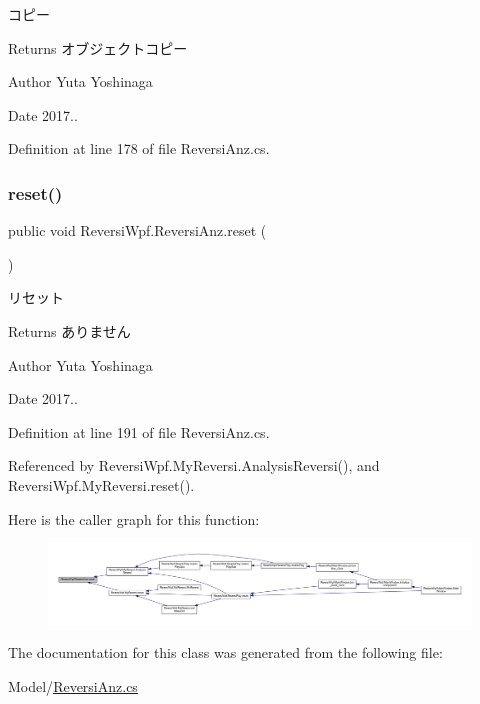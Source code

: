 コピー 

\begin{DoxyReturn}{Returns}
オブジェクトコピー 
\end{DoxyReturn}
\begin{DoxyAuthor}{Author}
Yuta Yoshinaga 
\end{DoxyAuthor}
\begin{DoxyDate}{Date}
2017.. 
\end{DoxyDate}


Definition at line 178 of file Reversi\+Anz.\+cs.

\mbox{\label{class_reversi_wpf_1_1_reversi_anz_a436fc0f66a511af5d589fe2ef493c8af}} 
\subsubsection{\texorpdfstring{reset()}{reset()}}
{\footnotesize\ttfamily public void Reversi\+Wpf.\+Reversi\+Anz.\+reset (\begin{DoxyParamCaption}{ }\end{DoxyParamCaption})}



リセット 

\begin{DoxyReturn}{Returns}
ありません 
\end{DoxyReturn}
\begin{DoxyAuthor}{Author}
Yuta Yoshinaga 
\end{DoxyAuthor}
\begin{DoxyDate}{Date}
2017.. 
\end{DoxyDate}


Definition at line 191 of file Reversi\+Anz.\+cs.



Referenced by Reversi\+Wpf.\+My\+Reversi.\+Analysis\+Reversi(), and Reversi\+Wpf.\+My\+Reversi.\+reset().

Here is the caller graph for this function\+:\nopagebreak
\begin{figure}[H]
\begin{center}
\leavevmode
\includegraphics[width=350pt]{class_reversi_wpf_1_1_reversi_anz_a436fc0f66a511af5d589fe2ef493c8af_icgraph}
\end{center}
\end{figure}


The documentation for this class was generated from the following file\+:\begin{DoxyCompactItemize}
\item 
Model/\hyperlink{_reversi_anz_8cs}{Reversi\+Anz.\+cs}\end{DoxyCompactItemize}
